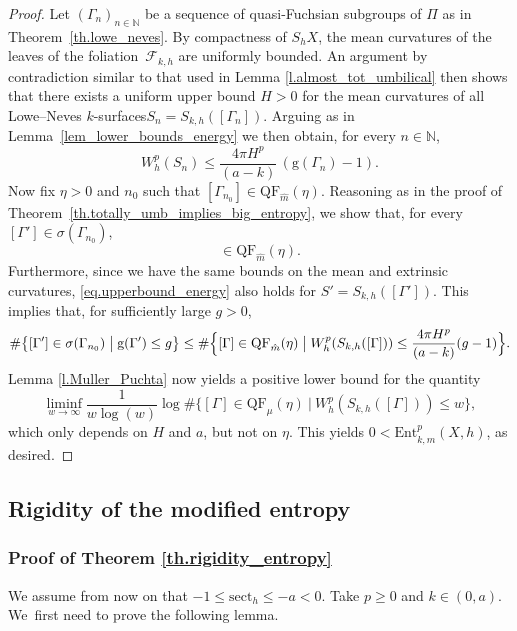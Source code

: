 \documentclass[10pt]{amsart}
\newcommand{\ksurfaces}{$k$\nobreakdash-surfaces\xspace}
\theoremstyle{plain}
\theoremstyle{definition}
\newcommand{\N}{{\mathbb N}}
\newcommand{\cF}{{\mathcal F}}
\newcommand{\sect}{\mathrm{sect}}
\newcommand{\Ent}{\mathrm{Ent}}
\newcommand{\QF}{\mathrm{QF}}
\let\Subsection\subsection\let\Subsubsection\subsubsection
\begin{document}
\begin{proof} Let $(\Gamma_n)_{n\in\mathbb{N}}$ be a sequence of quasi-Fuchsian subgroups of $\Pi$ as in Theorem~\ref{th.lowe_neves}. By compactness of $S_hX$, the mean curvatures of the leaves of the foliation~$\cF_{k,h}$ are uniformly bounded. An argument by contradiction similar to that used in Lemma \ref{l.almost_tot_umbilical} then shows that there exists a uniform upper bound $H>0$ for the mean curvatures of all Lowe--Neves \ksurfaces $S_n=S_{k,h}([\Gamma_n])$. Arguing as in Lemma~\ref{lem_lower_bounds_energy} we then obtain, for every $n\in\N$,
\begin{equation}\label{eq.upperbound_energy}
W^{p}_{h}(S_n)\leq \frac{4\pi H^p}{(a-k)}\,(\mathrm{g}(\Gamma_n)-1).
\end{equation}
Now fix $\eta>0$ and $n_0$ such that $[\Gamma_{n_0}]\in\QF_{\hat m}(\eta)$. Reasoning as in the proof of Theo\-rem~\ref{th.totally_umb_implies_big_entropy}, we show that, for every $[\Gamma']\in\sigma(\Gamma_{n_0})$,
\begin{equation*}
[\Gamma']\in\QF_{\hat m}(\eta).
\end{equation*}
Furthermore, since we have the same bounds on the mean and extrinsic curvatures, \eqref{eq.upperbound_energy} also holds for $S'=S_{k,h}([\Gamma'])$. This implies that, for sufficiently large $g>0$,
\begin{equation*}
\#\bigl\{[\Gamma']\in\sigma(\Gamma_{n_0})\bigm| \mathrm{g}(\Gamma')\leq g\bigr\}\leq\#\Bigl\{[\Gamma]\in\QF_{\hat m}(\eta)\bigm| W^{p}_{h}(S_{k,h}([\Gamma]))\leq \frac{4\pi H^p}{(a-k)}(g-1)\Bigr\}.
\end{equation*}
Lemma \ref{l.Muller_Puchta} now yields a positive lower bound for the quantity
\begin{equation*}
\liminf_{w\to\infty}\frac{1}{w\log(w)}\log\#\bigl\{[\Gamma]\in\QF_\mu(\eta)\ \big|\ W^{p}_{h}(S_{k,h}([\Gamma]))\leq w\bigr\},
\end{equation*}
which only depends on $H$ and $a$, but not on $\eta$. This yields $0<\Ent^p_{k,\hat m}(X,h)$, as desired.
\end{proof}

\Subsection{Rigidity of the modified entropy}

\subsubsection{Proof of Theorem \ref{th.rigidity_entropy}} We assume from now on that $-1\leq\sect_h\leq -a <0$. Take $p\geq 0$ and $k\in(0,a)$. We~first need to prove the following lemma.
\end{document}

